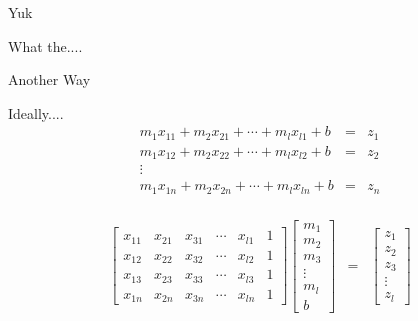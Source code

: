 \documentclass[svgnames,table,,aspectratio=169]{beamer}
\begin{document}
\begin{frame}{Yuk}

  What the....
  
\end{frame}

\begin{frame}{Another Way}

  Ideally....
  \begin{eqnarray*}
    m_1 x_{11} + m_2 x_{21} + \cdots + m_lx_{l1} + b  & = &   z_1 \\
    m_1 x_{12} + m_2 x_{22} + \cdots + m_lx_{l2} + b  & = &   z_2 \\
    \vdots & & \\
    m_1 x_{1n} + m_2 x_{2n} + \cdots + m_lx_{ln} + b & = & z_n  \\
  \end{eqnarray*}

  \begin{eqnarray*}
    \left[
    \begin{array}{rrrrrr}
      x_{11} & x_{21} & x_{31} &  \cdots & x_{l1} & 1 \\
      x_{12} & x_{22} & x_{32} &  \cdots & x_{l2} & 1 \\
      x_{13} & x_{23} & x_{33} &  \cdots & x_{l3} & 1 \\

      x_{1n} & x_{2n} & x_{3n} &  \cdots & x_{ln} & 1 
    \end{array}
    \right]
    \left[
    \begin{array}{r}
      m_1 \\
      m_2 \\
      m_3 \\
      \vdots \\
      m_l \\
      b  
    \end{array}
    \right]
             & = &
                   \left[
                   \begin{array}{r}
                     z_1 \\
                     z_2 \\
                     z_3 \\
                     \vdots \\
                     z_l
                   \end{array}
    \right]
  \end{eqnarray*}
  
  
\end{frame}
\end{document}
